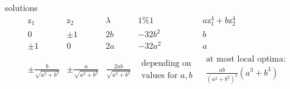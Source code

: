 solutions
\[ \begin{array}{c|c|c|c|c}
	\mathrm{z}_1 & \mathrm{z}_2 & \lambda & 1 \% 1 
		& a\mathrm{z}^4_1 + b\mathrm{z}^4_2 \\
	\hline 
	0 & \pm 1 & 2b & -32b^2 & b \\
	\pm 1 & 0 & 2a & -32a^2 & a \\
	\pm \frac{b}{\sqrt{a^2 + b^2}} & \pm \frac{a}{\sqrt{a^2 + b^2}}
		& \frac{2ab}{\sqrt{a^2 + b^2}}
		& \substack{\text{depending on} \\ \text{values for }a,b}
		& \substack{\text{at most local optima:} \\
			\frac{ab}{(a^2+b^2)^2} (a^3+b^3)}
\end{array}\]
